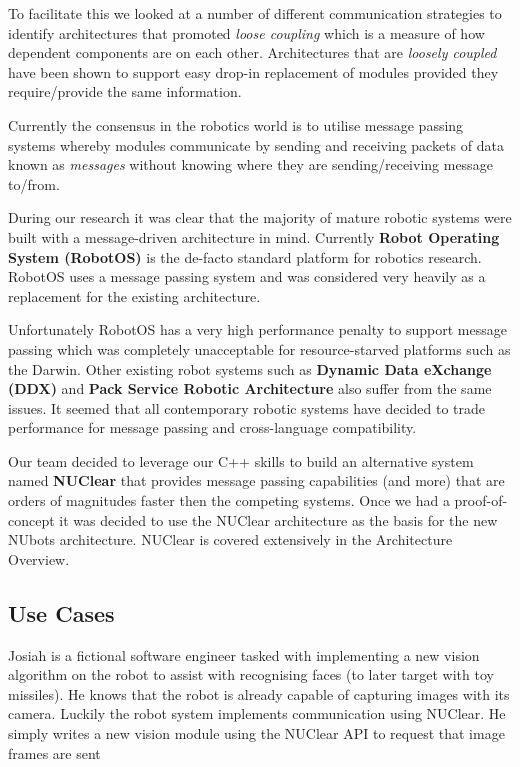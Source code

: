 \documentclass[english,12pt]{scrartcl}
\begin{document}
				To facilitate this we looked at a number of different communication strategies to identify architectures that promoted \emph{loose coupling} which is a measure of how dependent components are on each other. 
				Architectures that are \emph{loosely coupled} have been shown to support easy drop-in replacement of modules provided they require/provide the same information.
				 
				Currently the consensus in the robotics world is to utilise message passing systems whereby modules communicate by sending and receiving packets of data known as \emph{messages} without knowing where they are sending/receiving message to/from.
				
				During our research it was clear that the majority of mature robotic systems were built with a message-driven architecture in mind. 
				Currently \textbf{Robot Operating System (RobotOS)} is the de-facto standard platform for robotics research.
				RobotOS uses a message passing system and was considered very heavily as a replacement for the existing architecture.
				
				Unfortunately RobotOS has a very high performance penalty to support message passing which was completely unacceptable for resource-starved platforms such as the Darwin. 
				Other existing robot systems such as \textbf{Dynamic Data eXchange (DDX)} and  \textbf{Pack Service Robotic Architecture} also suffer from the same issues. It seemed that all contemporary robotic systems have decided to trade performance for message passing and cross-language compatibility.
				
				Our team decided to leverage our C++ skills to build an alternative system named \textbf{NUClear} that provides message passing capabilities (and more) that are orders of magnitudes faster then the competing systems. 
				Once we had a proof-of-concept it was decided to use the NUClear architecture as the basis for the new NUbots architecture. NUClear is covered extensively in the Architecture Overview.
				
				
		\subsection{Use Cases}
			Josiah is a fictional software engineer tasked with implementing a new vision algorithm on the robot to assist with recognising faces (to later target with toy missiles).
			He knows that the robot is already capable of capturing images with its camera.
			Luckily the robot system implements communication using NUClear. 
			He simply writes a new vision module using the NUClear API to request that image frames are sent 
			
\end{document}
